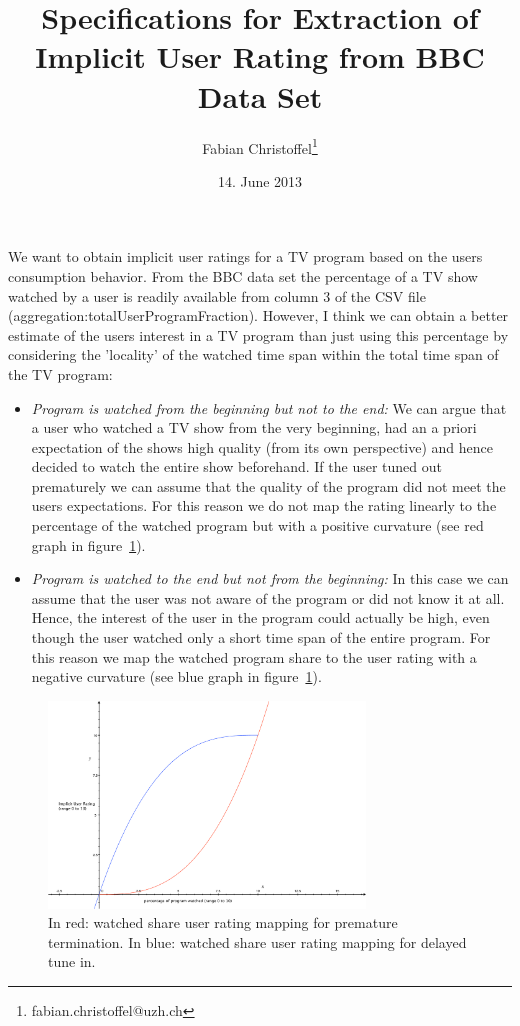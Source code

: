 \documentclass[parskip=full]{scrartcl}
\title{Specifications for Extraction of Implicit User Rating from BBC Data Set}
\date{14. June 2013}
\author{Fabian Christoffel\footnote{fabian.christoffel@uzh.ch}}
\begin{document}
We want to obtain implicit user ratings for a TV program based on the users consumption behavior. From the BBC data set the percentage of a TV show watched by a user is readily available from column 3 of the CSV file (aggregation:totalUserProgramFraction). However, I think we can obtain a better estimate of the users interest in a TV program than just using this percentage by considering the 'locality' of the watched time span within the total time span of the TV program:
\begin{itemize}
	\item \textit{Program is watched from the beginning but not to the end:} We can argue that a user who watched a TV show from the very beginning, had an a priori expectation of the shows high quality (from its own perspective) and hence decided to watch the entire show beforehand. If the user tuned out prematurely we can assume that the quality of the program did not meet the users expectations. For this reason we do not map the rating linearly to the percentage of the watched program but with a positive curvature (see red graph in figure~\ref{fig:kurven}).
	\item \textit{Program is watched to the end but not from the beginning:} In this case we can assume that the user was not aware of the program or did not know it at all. Hence, the interest of the user in the program could actually be high, even though the user watched only a short time span of the entire program. For this reason we map the watched program share to the user rating with a negative curvature (see blue graph in figure~\ref{fig:kurven}).
\end{itemize}

\begin{figure}[h!]
   \centering
      \includegraphics[width=0.75\textwidth]{kurven2}
   \caption{In red: watched share user rating mapping for premature termination. In blue: watched share user rating mapping for delayed tune in.}
   \label{fig:kurven}
\end{figure}
\end{document}
